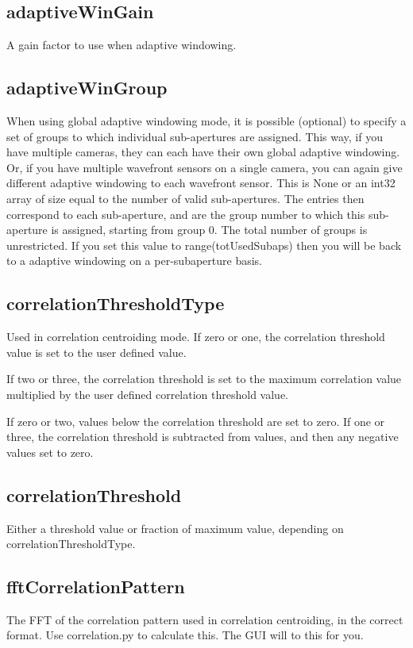 \documentclass[a4,10pt]{article}
\begin{document}
\subsection{adaptiveWinGain}
A gain factor to use when adaptive windowing.

\subsection{adaptiveWinGroup}
When using global adaptive windowing mode, it is possible (optional)
to specify a set of groups to which individual sub-apertures are
assigned.  This way, if you have multiple cameras, they can each have
their own global adaptive windowing.  Or, if you have multiple
wavefront sensors on a single camera, you can again give different
adaptive windowing to each wavefront sensor.  This is None or an int32
array of size equal to the number of valid sub-apertures.  The entries
then correspond to each sub-aperture, and are the group number to
which this sub-aperture is assigned, starting from group 0.  The total
number of groups is unrestricted.  If you set this value to
range(totUsedSubaps) then you will be back to a adaptive windowing on a
per-subaperture basis.

\subsection{correlationThresholdType}
Used in correlation centroiding mode.
If zero or one, the correlation threshold value is set to
the user defined value.

If two or three, the correlation threshold is set to the maximum
correlation value multiplied by the user defined correlation threshold
value.

If zero or two, values below the correlation threshold are set to
zero.  If one or three, the correlation threshold is subtracted from
values, and then any negative values set to zero.

\subsection{correlationThreshold}
Either a threshold value or fraction of maximum value, depending on
correlationThresholdType.

\subsection{fftCorrelationPattern}
The FFT of the correlation pattern used in correlation centroiding, in
the correct format.  Use correlation.py to calculate this.  The GUI
will to this for you.
\end{document}
